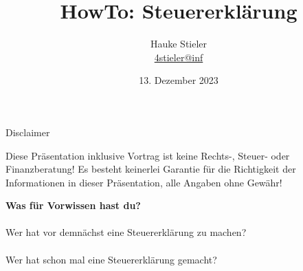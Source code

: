 \documentclass{beamer}
\author[Hauke Stieler]{Hauke Stieler\\\href{mailto:4stieler@informatik.uni-hamburg.de}{4stieler@inf}}
\title{HowTo: Steuererklärung}
\date{13. Dezember 2023}
\begin{document}
	{
		\addtocounter{page}{-1}
		\frame{}
	}

	{
		\maketitle
		\addtocounter{page}{-1}
	}
	
	\begin{frame}{Disclaimer}
		\begin{center}
			Diese Präsentation inklusive Vortrag ist keine Rechts-, Steuer- oder Finanzberatung!\n
			Es besteht keinerlei Garantie für die Richtigkeit der Informationen in dieser Präsentation, alle Angaben ohne Gewähr!\n
		\end{center}
	\end{frame}

	\begin{frame}
		\begin{center}
			\textbf{Was für Vorwissen hast du?}\\\pause
			\hfill\\
			Wer hat vor demnächst eine Steuererklärung zu machen?\\\pause
			\hfill\\
			Wer hat schon mal eine Steuererklärung gemacht?
		\end{center}
	\end{frame}
\end{document}
